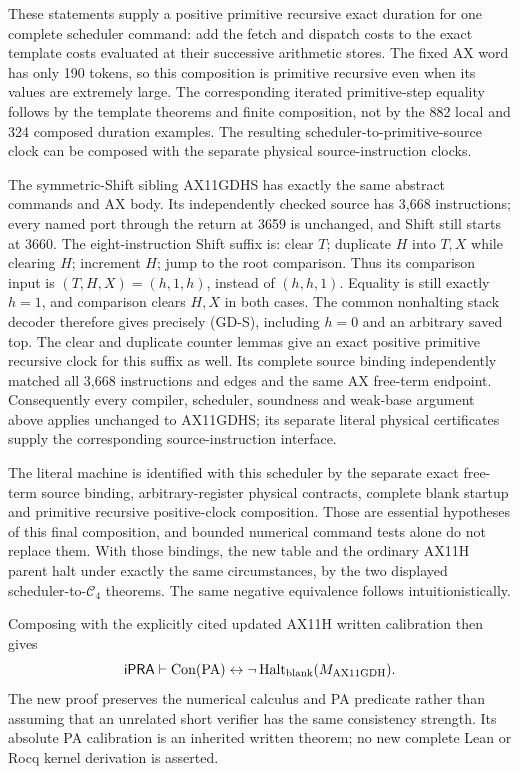 These statements supply a positive primitive recursive exact duration
for one complete scheduler command: add the fetch and dispatch costs to
the exact template costs evaluated at their successive arithmetic stores.
The fixed AX word has only 190 tokens, so this composition is primitive
recursive even when its values are extremely large. The corresponding
iterated primitive-step equality follows by the template theorems and
finite composition, not by the 882 local and 324 composed duration
examples. The resulting scheduler-to-primitive-source clock can be
composed with the separate physical source-instruction clocks.

The symmetric-Shift sibling AX11GDHS has exactly the same abstract
commands and AX body. Its independently checked source has 3,668
instructions; every named port through the return at 3659 is unchanged,
and Shift still starts at 3660. The eight-instruction Shift suffix is:
clear $T$; duplicate $H$ into $T,X$ while clearing $H$; increment $H$;
jump to the root comparison. Thus its comparison input is
$(T,H,X)=(h,1,h)$, instead of $(h,h,1)$. Equality is still exactly
$h=1$, and comparison clears $H,X$ in both cases. The common nonhalting
stack decoder therefore gives precisely (GD-S), including $h=0$ and
an arbitrary saved top. The clear and duplicate counter lemmas give an
exact positive primitive recursive clock for this suffix as well.
Its complete source binding independently matched all 3,668 instructions
and edges and the same AX free-term endpoint. Consequently every
compiler, scheduler, soundness and weak-base argument above applies
unchanged to AX11GDHS; its separate literal physical certificates supply
the corresponding source-instruction interface.

The literal machine is identified with this scheduler by the separate
exact free-term source binding, arbitrary-register physical contracts,
complete blank startup and primitive recursive positive-clock composition.
Those are essential hypotheses of this final composition, and bounded
numerical command tests alone do not replace them. With those bindings,
the new table and the ordinary AX11H parent halt under exactly the same
circumstances, by the two displayed scheduler-to-$\mathcal C_4$ theorems.
The same negative equivalence follows intuitionistically.

Composing with the explicitly cited updated AX11H written calibration
then gives
\[
 \mathsf{iPRA}\vdash
  \operatorname{Con}(\mathrm{PA})
        \leftrightarrow\neg\operatorname{Halt}_{\rm blank}(M_{\rm AX11GDH}).
\]
The new proof preserves the numerical calculus and PA predicate rather
than assuming that an unrelated short verifier has the same consistency
strength. Its absolute PA calibration is an inherited written theorem;
no new complete Lean or Rocq kernel derivation is asserted.

